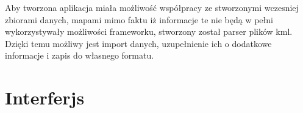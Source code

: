 Aby tworzona aplikacja miała możliwość współpracy ze stworzonymi wczesniej zbiorami danych, mapami mimo faktu iż informacje te nie będą w pełni wykorzystywały możliwości frameworku, stworzony został parser plików kml. Dzięki temu możliwy jest import danych, uzupełnienie ich o dodatkowe informacje i zapis do własnego formatu.






\section{Interferjs}
\label{sec:Interferjs}


